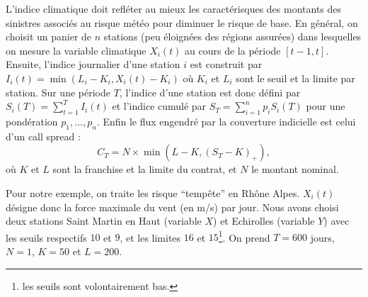 \documentclass[11pt]{article}
\begin{document}
L'indice climatique doit refl\'eter au mieux les caract\'erisques des montants des sinistres associ\'es au risque m\'et\'eo pour diminuer
le risque de base. En g\'en\'eral, on choisit un panier de $n$ stations (peu \'eloign\'ees des r\'egions assur\'ees) dans lesquelles on 
mesure la variable climatique $X_i(t)$ au cours de la p\'eriode $[t-1,t]$. Ensuite, l'indice journalier d'une station $i$ est construit
par $I_i(t) = \min(L_i-K_i, X_i(t) - K_i)$ o\`u $K_i$ et $L_i$ sont le seuil et la limite par station. Sur une p\'eriode $T$, l'indice d'une station 
est donc d\'efini par $S_i(T) = \sum_{t=1}^T I_i(t)$ et l'indice cumul\'e par $S_T =  \sum_{i=1}^n p_i S_i(T)$ pour une pond\'eration 
$p_1, \dots, p_n$. Enfin le flux engendr\'e par la couverture indicielle est celui d'un call spread : $$C_T = N \times 
\min\left(L-K, \left(S_T-K\right)_+\right),$$
o\`u $K$ et $L$ sont la franchise et la limite du contrat, et $N$ le montant nominal.

Pour notre exemple, on traite les risque ``temp\^ete'' en Rh\^one Alpes. $X_i(t)$ d\'esigne donc la force maximale du vent (en m/s) par jour.
Nous avons choisi deux stations Saint Martin en Haut (variable $X$) et Echirolles (variable $Y$) avec les seuils respectifs $10$ et $9$, et les limites $16$ et $15$\footnote{les seuils sont volontairement bas.}. On prend $T=600$ jours, $N=1$, $K=50$ et $L=200$.
\end{document}
